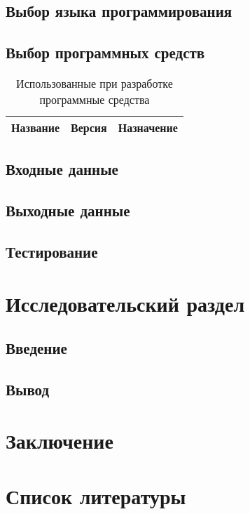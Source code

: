 \subsection{Выбор языка программирования}
\subsection{Выбор программных средств}

\begin{table}[h]
    \caption{Использованные при разработке программные средства}
    \centering
    \begin{tabu}{|>{\centering}p{3.5cm}|>{\centering}p{2.3cm}|X[c]|}
    	\hline
    	Название                         & Версия           & 
    	Назначение                                                \\ \hline
    	\hline
    \end{tabu}
    \label{tab:software}
\end{table}

\subsection{Входные данные}

\subsection{Выходные данные}

\subsection{Тестирование}

\section{Исследовательский раздел}
\subsection{Введение}

\subsection{Вывод}

\section{Заключение}

\section{Список литературы}
\nocite{datasetList, rgbdBenchmark, msds}
\printbibliography[heading=none]


